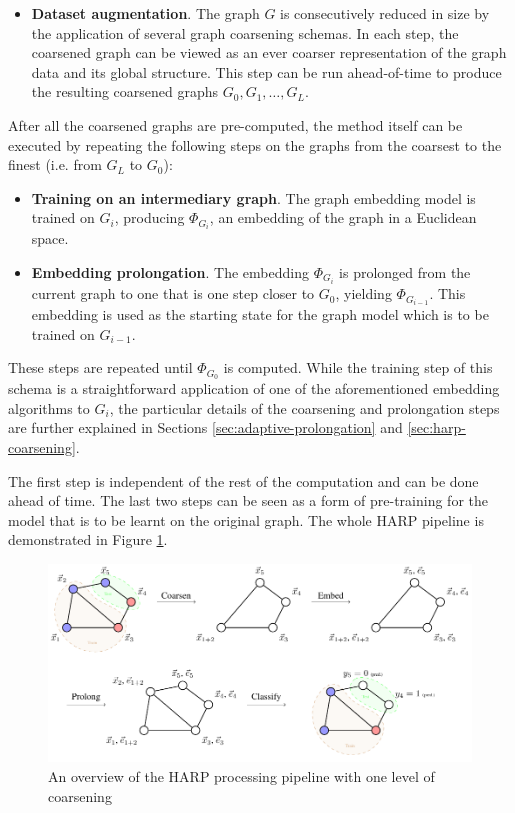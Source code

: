 \begin{itemize}
  \item \textbf{Dataset augmentation}. The graph \( G \) is consecutively reduced in size by the application of several graph coarsening schemas. In each step, the coarsened graph can be viewed as an ever coarser representation of the graph data and its global structure. This step can be run ahead-of-time to produce the resulting coarsened graphs \( G_0, G_1, \dots, G_L \).
\end{itemize}
After all the coarsened graphs are pre-computed, the method itself can be executed by repeating the following steps on the graphs from the coarsest to the finest (i.e. from \( G_L \) to \( G_0 \)):
\begin{itemize}
  \item \textbf{Training on an intermediary graph}. The graph embedding model is trained on \( G_i \), producing \( \Phi_{G_i} \), an embedding of the graph in a Euclidean space.
  \item \textbf{Embedding prolongation}. The embedding \( \Phi_{G_i} \) is prolonged from the current graph to one that is one step closer to \( G_0 \), yielding \( \Phi_{G_{i - 1}} \). This embedding is used as the starting state for the graph model which is to be trained on \( G_{i - 1} \).
\end{itemize}
These steps are repeated until \( \Phi_{G_0} \) is computed. While the training step of this schema is a straightforward application of one of the aforementioned embedding algorithms to \( G_i \), the particular details of the coarsening and prolongation steps are further explained in Sections \ref{sec:adaptive-prolongation} and \ref{sec:harp-coarsening}.

The first step is independent of the rest of the computation and can be done ahead of time. The last two steps can be seen as a form of pre-training for the model that is to be learnt on the original graph. The whole HARP pipeline is demonstrated in Figure \ref{fig:harp-overview}.

\begin{figure}
  \centering
  \includegraphics[width=\linewidth]{images/harp-overview/harp-overview.pdf}
  \caption{An overview of the HARP processing pipeline with one level of coarsening}
  \label{fig:harp-overview}
\end{figure}

